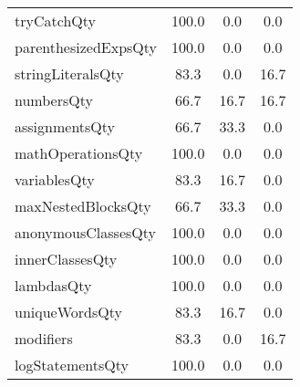 \begin{tabular}{lccc}
tryCatchQty & 100.0 & 0.0 & 0.0 \\
parenthesizedExpsQty & 100.0 & 0.0 & 0.0 \\
stringLiteralsQty & 83.3 & 0.0 & 16.7 \\
numbersQty & 66.7 & 16.7 & 16.7 \\
assignmentsQty & 66.7 & 33.3 & 0.0 \\
mathOperationsQty & 100.0 & 0.0 & 0.0 \\
variablesQty & 83.3 & 16.7 & 0.0 \\
maxNestedBlocksQty & 66.7 & 33.3 & 0.0 \\
anonymousClassesQty & 100.0 & 0.0 & 0.0 \\
innerClassesQty & 100.0 & 0.0 & 0.0 \\
lambdasQty & 100.0 & 0.0 & 0.0 \\
uniqueWordsQty & 83.3 & 16.7 & 0.0 \\
modifiers & 83.3 & 0.0 & 16.7 \\
logStatementsQty & 100.0 & 0.0 & 0.0 \\
\bottomrule
              \end{tabular}
            